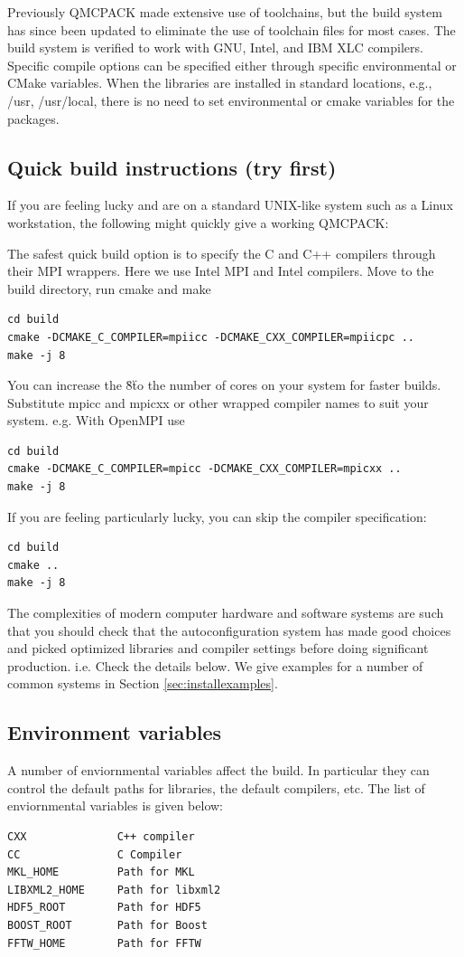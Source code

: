 Previously QMCPACK made extensive use of toolchains, but the build system
has since been updated to eliminate the use of toolchain files for
most cases.  The build system is verified to work with GNU, Intel, and IBM XLC
compilers.  Specific compile options can be specified either through
specific environmental or CMake variables.  When the libraries are
installed in standard locations, e.g., /usr, /usr/local, there is no
need to set environmental or cmake variables for the packages.

\subsection{Quick build instructions (try first)}
\label{sec:cmakequick}

If you are feeling lucky and are on a standard UNIX-like system such
as a Linux workstation, the following might quickly give a
working QMCPACK:

The safest quick build option is to specify the C and C++ compilers
through their MPI wrappers. Here we use Intel MPI and Intel
compilers. Move to the build directory, run cmake and make
\begin{verbatim}
cd build
cmake -DCMAKE_C_COMPILER=mpiicc -DCMAKE_CXX_COMPILER=mpiicpc ..
make -j 8
\end{verbatim}
You can increase the \"8\" to the number of cores on your system for
faster builds. Substitute mpicc and mpicxx or other wrapped compiler names to suit
  your system. e.g. With OpenMPI use
\begin{verbatim}
cd build
cmake -DCMAKE_C_COMPILER=mpicc -DCMAKE_CXX_COMPILER=mpicxx ..
make -j 8
\end{verbatim}

If you are feeling particularly lucky, you can skip the compiler specification:
\begin{verbatim}
cd build
cmake ..
make -j 8
\end{verbatim}

The complexities of modern computer hardware and software systems are
such that you should check that the autoconfiguration system has made
good choices and picked optimized libraries and compiler settings
before doing significant production. i.e. Check the details below. We
give examples for a number of common systems in Section \ref{sec:installexamples}.

\subsection{Environment variables}
A number of enviornmental variables affect the build.  In particular
they can control the default paths for libraries, the default
compilers, etc.  The list of enviornmental variables is given below:
\begin{verbatim}
CXX              C++ compiler
CC               C Compiler
MKL_HOME         Path for MKL
LIBXML2_HOME     Path for libxml2
HDF5_ROOT        Path for HDF5
BOOST_ROOT       Path for Boost
FFTW_HOME        Path for FFTW
\end{verbatim}

